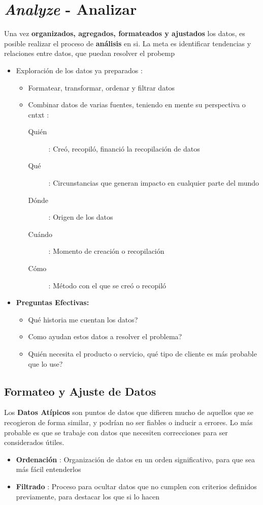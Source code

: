 
\section{\textit{Analyze} - Analizar}
Una vez \textbf{organizados, agregados, formateados y ajustados} los datos, es posible realizar el proceso de \textbf{análisis} en si. La meta es identificar tendencias y relaciones entre datos, que puedan resolver el \gls{probemp}

\begin{itemize}
    \item {Exploración de los datos ya preparados :
    \begin{itemize}
        \item {Formatear, transformar, ordenar y filtrar datos}
        \item {Combinar datos de varias fuentes, teniendo en mente su perspectiva o \gls{cntxt} : 
        \begin{description}
            \item[Quién]{ : Creó, recopiló, financió la recopilación de datos}
            \item[Qué]{ : Circunstancias que generan impacto en cualquier parte del mundo}
            \item[Dónde]{ : Origen de los datos}
            \item[Cuándo]{ : Momento de creación o recopilación} 
            \item[Cómo]{ : Método con el que se creó o recopiló} 
        \end{description}}
    \end{itemize}}
    \item {\textbf{Preguntas Efectivas:}
    \begin{itemize}
        \item {Qué historia me cuentan los datos?}
        \item {Como ayudan estos datos a resolver el problema?}
        \item {Quién necesita el producto o servicio, qué tipo de cliente es más probable que lo use?}
    \end{itemize}}
\end{itemize}

\subsection{Formateo y Ajuste de Datos}
Los \textbf{Datos Atípicos} son puntos de datos que difieren mucho de aquellos que se recogieron de forma similar, y podrían no ser fiables o inducir a errores. Lo más probable es que se trabaje con datos que necesiten correcciones para ser considerados útiles. 

\begin{itemize}
    \item {\textbf{Ordenación} : Organización de datos en un orden significativo, para que sea más fácil entenderlos} 
    \item {\textbf{Filtrado} : Proceso para ocultar datos que no cumplen con criterios definidos previamente, para destacar los que si lo hacen}
\end{itemize}